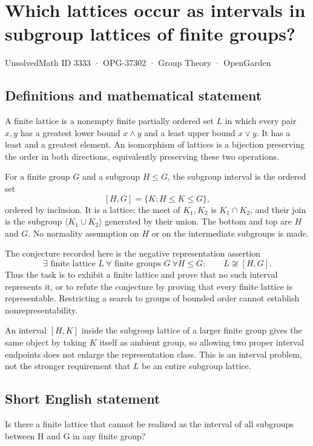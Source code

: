 \documentclass[11pt,a4paper]{article}
\begin{document}
\section*{Which lattices occur as intervals in subgroup lattices of finite groups?}\label{3333}
{\small UnsolvedMath ID 3333 · OPG-37302 · Group Theory · OpenGarden}
\subsection{Definitions and mathematical statement}
A finite lattice is a nonempty finite partially ordered set $L$ in
which every pair $x,y$ has a greatest lower bound $x\wedge y$ and
a least upper bound $x\vee y$. It has a least and a greatest element.
An isomorphism of lattices is a bijection preserving the order in
both directions, equivalently preserving these two operations.

For a finite group $G$ and a subgroup $H\le G$, the subgroup interval
is the ordered set
\[
                         [H,G]=\{K:H\le K\le G\},
\]
ordered by inclusion. It is a lattice: the meet of $K_1,K_2$ is
$K_1\cap K_2$, and their join is the subgroup
$\langle K_1\cup K_2\rangle$ generated by their union. The bottom
and top are $H$ and $G$. No normality assumption on $H$ or on the
intermediate subgroups is made.

The conjecture recorded here is the negative representation assertion
\[
 \exists\text{ finite lattice }L\ \forall\text{ finite groups }G
 \ \forall H\le G:\qquad L\not\cong[H,G].
\]
Thus the task is to exhibit a finite lattice and prove that no such
interval represents it, or to refute the conjecture by proving
that every finite lattice is representable. Restricting a search
to groups of bounded order cannot establish nonrepresentability.

An interval $[H,K]$ inside the subgroup lattice of a larger finite
group gives the same object by taking $K$ itself as ambient group,
so allowing two proper interval endpoints does not enlarge the
representation class. This is an interval problem, not the stronger
requirement that $L$ be an entire subgroup lattice.
\subsection{Short English statement}
Is there a finite lattice that cannot be realized as the interval of all subgroups between H and G in any finite group?
\end{document}
